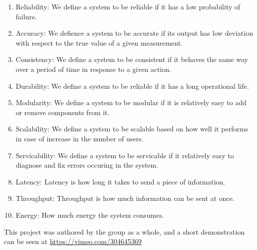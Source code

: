 \begin{enumerate}
	\item Reliability: We define a system to be reliable if it has a low probability of failure.
	\item Accuracy: We defience a system to be accurate if its output has low deviation with respect to the true value of a given measurement.
	\item Consistency: We define a system to be consistent if it behaves the same way over a period of time in response to a given action.
	\item Durability: We define a system to be reliable if it has a long operational life.
	\item Modularity: We define a system to be modular if it is relatively easy to add or remove components from it.
	\item Scalability: We define a system to be scalable based on how well it performs in case of increase in the number of users.
	\item Servicability: We define a system to be servicable if it relatively easy to diagnose and fix errors occuring in the system.
	\item Latency: Latency is how long it takes to send a piece of information.
	\item Throughput: Throughput is how much information can be sent at once.
	\item Energy: How much energy the system consumes.
\end{enumerate}\label{Quality Measurementes}

This project was authored by the group as a whole, and a short demonstration can be seen at \url{https://vimeo.com/304645369}
